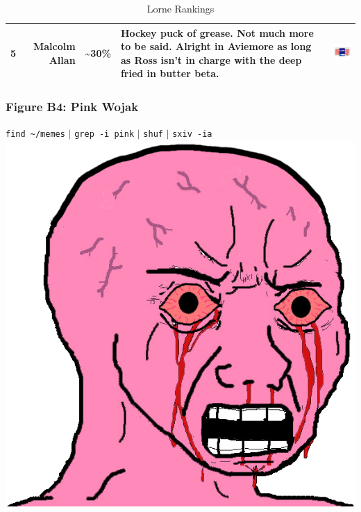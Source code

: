 \documentclass[11pt, english]{article}
\begin{document}
\begin{table}[h]
\begin{center}
\begin{tabular}{rr|p{1.25cm}p{3.5cm}p{2.5cm}}
			5 & Malcolm Allan & \textasciitilde30\% & Hockey puck of grease. Not much more to be said. Alright in Aviemore as long as Ross isn't in charge with the deep fried in butter beta. & \vspace{-0.25cm}\includegraphics[width=2.5cm]{../System/Photos/ma_lorne.jpg}\\
			\hline
		\end{tabular}
			\caption{Lorne Rankings}
		\end{center}
		\end{table}

\newpage

		\subsubsection*{Figure B4: Pink Wojak}
	
	\begin{center}	
		\verb|find ~/memes| $\mathtt{\vert}$ \verb|grep -i pink| $\mathtt{\vert}$ \verb|shuf| $\mathtt{\vert}$ \verb|sxiv -ia|\\[2cm]
		\includegraphics[width=14cm,height=14cm]{../System/Photos/pink.png}
	\end{center}
\end{document}
